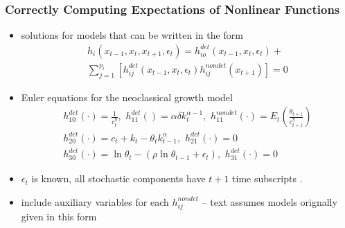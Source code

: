 \documentclass{beamer}
\begin{document}
\begin{frame}
  \frametitle{Correctly Computing Expectations of Nonlinear Functions}
{\small 
  \begin{itemize}
  \item solutions for models that can be written in  the form
\begin{gather}
  h_i(x_{t-1},x_{t},x_{t+1},\epsilon_t)=h^{det}_{io}(x_{t-1},x_{t},\epsilon_t)+\\ 
\sum_{j=1}^{p_i} [h^{det}_{ij}(x_{t-1},x_{t},\epsilon_t)h^{nondet}_{ij}(x_{t+1})]=0
\end{gather}
\item Euler equations for the  neoclassical growth  model 
\label{sec:simple-rbc-model-ext} 
\begin{gather}
h_{10}^{det}(\cdot)=\frac{1}{c_t^\eta},\,\,
h_{11}^{det}()=\alpha \delta k_{t}^{\alpha-1} ,\,\,
h_{11}^{nondet}(\cdot)=E_t \left (\frac{\theta_{t+1}}{c_{t+1}^\eta} \right )\\
h_{20}^{det}(\cdot)=c_t + k_t-\theta_tk_{t-1}^\alpha,\,\,
h_{21}^{det}(\cdot)=0\\
h_{30}^{det}(\cdot)=\ln \theta_t -(\rho \ln \theta_{t-1} + \epsilon_t),\,\,
h_{31}^{det}(\cdot)=0
\end{gather}
\item $\epsilon_t$ is known, all stochastic components have $t+1$ time subscripts . 
\item include auxiliary variables for each $h_{ij}^{nondet}$  -- text assumes models orignally given in this form
  \end{itemize}




}
\end{frame}
\end{document}
